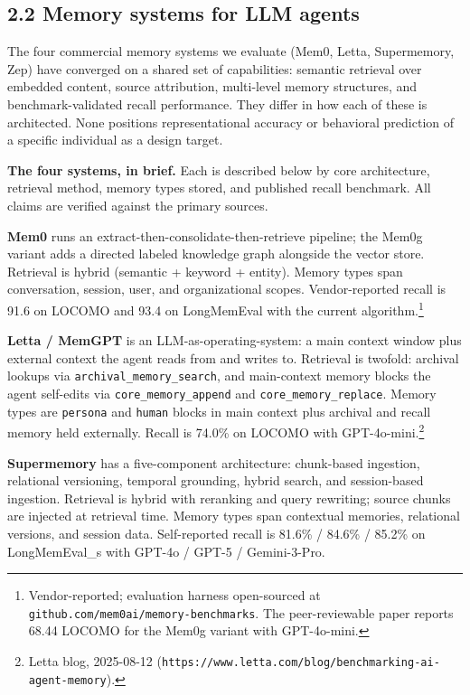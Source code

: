 \hypertarget{memory-systems-for-llm-agents}{%
\subsection{2.2 Memory systems for LLM
agents}\label{memory-systems-for-llm-agents}}

The four commercial memory systems we evaluate (Mem0, Letta,
Supermemory, Zep) have converged on a shared set of capabilities:
semantic retrieval over embedded content, source attribution,
multi-level memory structures, and benchmark-validated recall
performance. They differ in how each of these is architected. None
positions representational accuracy or behavioral prediction of a
specific individual as a design target.

\textbf{The four systems, in brief.} Each is described below by core
architecture, retrieval method, memory types stored, and published
recall benchmark. All claims are verified against the primary sources.

\textbf{Mem0} runs an extract-then-consolidate-then-retrieve pipeline;
the Mem0g variant adds a directed labeled knowledge graph alongside the
vector store. Retrieval is hybrid (semantic + keyword + entity).
Memory types span conversation, session, user, and organizational
scopes. Vendor-reported recall is 91.6 on LOCOMO and 93.4 on
LongMemEval with the current algorithm.\footnote{Vendor-reported;
  evaluation harness open-sourced at
  \texttt{github.com/mem0ai/memory-benchmarks}. The peer-reviewable
  paper \citep{chhikara2025mem0} reports 68.44 LOCOMO for the Mem0g
  variant with GPT-4o-mini.}

\textbf{Letta / MemGPT} is an LLM-as-operating-system: a main context
window plus external context the agent reads from and writes to.
Retrieval is twofold: archival lookups via
\texttt{archival\_memory\_search}, and main-context memory blocks the
agent self-edits via \texttt{core\_memory\_append} and
\texttt{core\_memory\_replace}. Memory types are \texttt{persona} and
\texttt{human} blocks in main context plus archival and recall memory
held externally. Recall is 74.0\% on LOCOMO with
GPT-4o-mini.\footnote{Letta blog, 2025-08-12
  (\texttt{https://www.letta.com/blog/benchmarking-ai-agent-memory}).}

\textbf{Supermemory} has a five-component architecture: chunk-based
ingestion, relational versioning, temporal grounding, hybrid search,
and session-based ingestion. Retrieval is hybrid with reranking and
query rewriting; source chunks are injected at retrieval time.
Memory types span contextual memories, relational versions, and
session data. Self-reported recall is 81.6\% / 84.6\% / 85.2\% on
LongMemEval\_s with GPT-4o / GPT-5 / Gemini-3-Pro.

